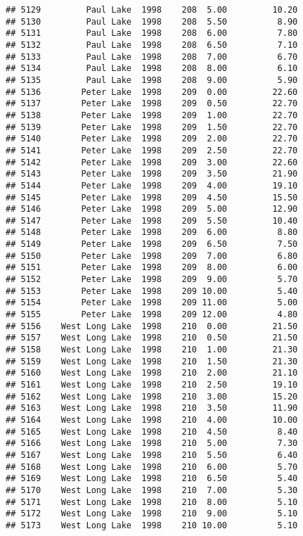 \documentclass[
]{article}
\begin{document}
\begin{verbatim}
## 5129         Paul Lake  1998    208  5.00         10.20
## 5130         Paul Lake  1998    208  5.50          8.90
## 5131         Paul Lake  1998    208  6.00          7.80
## 5132         Paul Lake  1998    208  6.50          7.10
## 5133         Paul Lake  1998    208  7.00          6.70
## 5134         Paul Lake  1998    208  8.00          6.10
## 5135         Paul Lake  1998    208  9.00          5.90
## 5136        Peter Lake  1998    209  0.00         22.60
## 5137        Peter Lake  1998    209  0.50         22.70
## 5138        Peter Lake  1998    209  1.00         22.70
## 5139        Peter Lake  1998    209  1.50         22.70
## 5140        Peter Lake  1998    209  2.00         22.70
## 5141        Peter Lake  1998    209  2.50         22.70
## 5142        Peter Lake  1998    209  3.00         22.60
## 5143        Peter Lake  1998    209  3.50         21.90
## 5144        Peter Lake  1998    209  4.00         19.10
## 5145        Peter Lake  1998    209  4.50         15.50
## 5146        Peter Lake  1998    209  5.00         12.90
## 5147        Peter Lake  1998    209  5.50         10.40
## 5148        Peter Lake  1998    209  6.00          8.80
## 5149        Peter Lake  1998    209  6.50          7.50
## 5150        Peter Lake  1998    209  7.00          6.80
## 5151        Peter Lake  1998    209  8.00          6.00
## 5152        Peter Lake  1998    209  9.00          5.70
## 5153        Peter Lake  1998    209 10.00          5.40
## 5154        Peter Lake  1998    209 11.00          5.00
## 5155        Peter Lake  1998    209 12.00          4.80
## 5156    West Long Lake  1998    210  0.00         21.50
## 5157    West Long Lake  1998    210  0.50         21.50
## 5158    West Long Lake  1998    210  1.00         21.30
## 5159    West Long Lake  1998    210  1.50         21.30
## 5160    West Long Lake  1998    210  2.00         21.10
## 5161    West Long Lake  1998    210  2.50         19.10
## 5162    West Long Lake  1998    210  3.00         15.20
## 5163    West Long Lake  1998    210  3.50         11.90
## 5164    West Long Lake  1998    210  4.00         10.00
## 5165    West Long Lake  1998    210  4.50          8.40
## 5166    West Long Lake  1998    210  5.00          7.30
## 5167    West Long Lake  1998    210  5.50          6.40
## 5168    West Long Lake  1998    210  6.00          5.70
## 5169    West Long Lake  1998    210  6.50          5.40
## 5170    West Long Lake  1998    210  7.00          5.30
## 5171    West Long Lake  1998    210  8.00          5.10
## 5172    West Long Lake  1998    210  9.00          5.10
## 5173    West Long Lake  1998    210 10.00          5.10

\end{verbatim}
\end{document}
